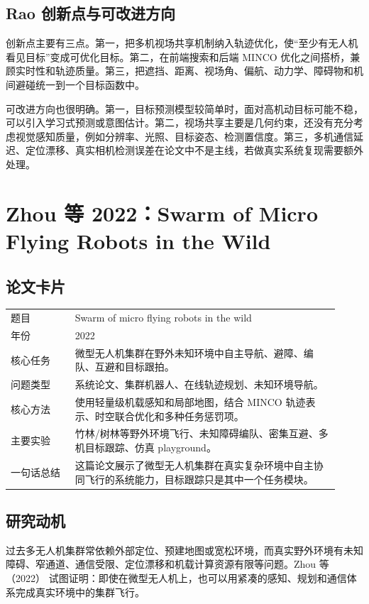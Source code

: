﻿\documentclass[UTF8,a4paper,11pt]{ctexart}
\newcommand{\Zhou}{Zhou 等（2022）}
\begin{document}
\subsection{Rao 创新点与可改进方向}

创新点主要有三点。第一，把多机视场共享机制纳入轨迹优化，使“至少有无人机看见目标”变成可优化目标。第二，在前端搜索和后端 MINCO 优化之间搭桥，兼顾实时性和轨迹质量。第三，把遮挡、距离、视场角、偏航、动力学、障碍物和机间避碰统一到一个目标函数中。

可改进方向也很明确。第一，目标预测模型较简单时，面对高机动目标可能不稳，可以引入学习式预测或意图估计。第二，视场共享主要是几何约束，还没有充分考虑视觉感知质量，例如分辨率、光照、目标姿态、检测置信度。第三，多机通信延迟、定位漂移、真实相机检测误差在论文中不是主线，若做真实系统复现需要额外处理。

\section{Zhou 等 2022：Swarm of Micro Flying Robots in the Wild}

\subsection{论文卡片}

\begin{longtable}{p{0.18\linewidth}p{0.74\linewidth}}
\toprule
题目 & Swarm of micro flying robots in the wild \\
年份 & 2022 \\
核心任务 & 微型无人机集群在野外未知环境中自主导航、避障、编队、互避和目标跟拍。 \\
问题类型 & 系统论文、集群机器人、在线轨迹规划、未知环境导航。 \\
核心方法 & 使用轻量级机载感知和局部地图，结合 MINCO 轨迹表示、时空联合优化和多种任务惩罚项。 \\
主要实验 & 竹林/树林等野外环境飞行、未知障碍编队、密集互避、多机目标跟踪、仿真 playground。 \\
一句话总结 & 这篇论文展示了微型无人机集群在真实复杂环境中自主协同飞行的系统能力，目标跟踪只是其中一个任务模块。 \\
\bottomrule
\end{longtable}

\subsection{研究动机}

过去多无人机集群常依赖外部定位、预建地图或宽松环境，而真实野外环境有未知障碍、窄通道、通信受限、定位漂移和机载计算资源有限等问题。\Zhou{} 试图证明：即使在微型无人机上，也可以用紧凑的感知、规划和通信体系完成真实环境中的集群飞行。
\end{document}
